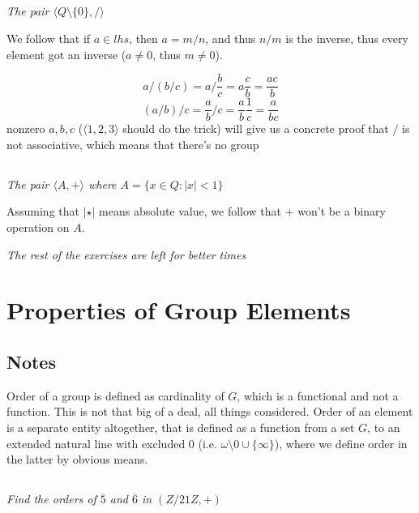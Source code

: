 \documentclass[11pt,oneside,titlepage]{book}
\newcommand{\eangle}[1]{\langle #1 \rangle}
\newcommand{\set}[1]{\{ #1 \}}
\begin{document}
\subsection{}

\textit{The pair $\eangle{Q \setminus \set{0}, /}$}

We follow that if $a \in lhs$, then $a = m/n$, and thus $n/m$ is the inverse, thus every element
got an inverse ($a \neq 0$, thus $m \neq 0$).

$$a / (b / c) = a / \frac{b}{c} = a \frac{c}{b} = \frac{ac}{b}$$
$$(a / b) / c = \frac{a}{b} / c = \frac{a}{b} \frac{1}{c} = \frac{a}{bc}$$
nonzero $a, b, c$ ($\eangle{1, 2, 3}$ should do the trick) will give us a concrete
proof that $/$ is not associative, which means that there's no group

\subsection{}

\textit{The pair $\eangle{A, +}$ where $A = \set{x \in Q: |x| < 1}$}

Assuming that $|\star|$ means absolute value, we follow that $+$ won't be a binary operation on $A$.

\textit{The rest of the exercises are left for better times}

\section{Properties of Group Elements}

\subsection*{Notes}

Order of a group is defined as cardinality of $G$, which is a functional and not a function. This
is not that big of a deal, all things considered. Order of an element is a separate entity
altogether, that is defined as a function from a set $G$, to an extended natural line
with excluded $0$ (i.e. $\omega \setminus 0 \cup \set{\infty}$), where we define order
in the latter by obvious means.

\subsection{}

\textit{Find the orders of $\overline{5}$ and $\overline{6}$ in $(Z/21Z, +)$}
\end{document}
